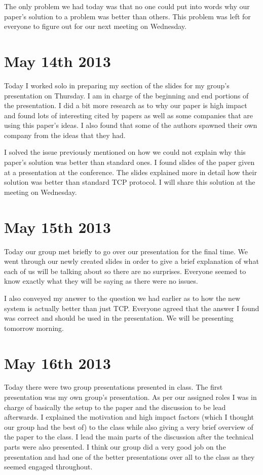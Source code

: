 \documentclass[conference]{IEEEtran}
\begin{document}
The only problem we had today was that no one could put into words why our paper's
solution to a problem was better than others. This problem was left for everyone
to figure out for our next meeting on Wednesday.

\section{May 14th 2013}
Today I worked solo in preparing my section of the slides for my group's
presentation on Thursday. I am in charge of the beginning and end portions of
the presentation. I did a bit more research as to why our paper is high impact
and found lots of interesting cited by papers as well as some companies
that are using this paper's ideas. I also found that some of the authors spawned
their own company from the ideas that they had.

I solved the issue previously mentioned on how we could not explain why this
paper's solution was better than standard ones. I found slides of the paper
given at a presentation at the conference. The slides explained more in detail
how their solution was better than standard TCP protocol. I will share this
solution at the meeting on Wednesday.

\section{May 15th 2013}
Today our group met briefly to go over our presentation for the final time.
We went through our newly created slides in order to give a brief explanation
of what each of us will be talking about so there are no surprises. Everyone
seemed to know exactly what they will be saying as there were no issues.

I also conveyed my answer to the question we had earlier as to how the new
system is actually better than just TCP. Everyone agreed that the answer I 
found was correct and should be used in the presentation. We will be
presenting tomorrow morning.

\section{May 16th 2013}
Today there were two group presentations presented in class. The first
presentation was my own group's presentation. As per our assigned roles
I was in charge of basically the setup to the paper and the discussion
to be lead afterwards. I explained the motivation and high impact factors
(which I thought our group had the best of) to the class while also giving
a very brief overview of the paper to the class. I lead the main parts of
the discussion after the technical parts were also presented. I think our
group did a very good job on the presentation and had one of the better
presentations over all to the class as they seemed engaged throughout.
\end{document}
